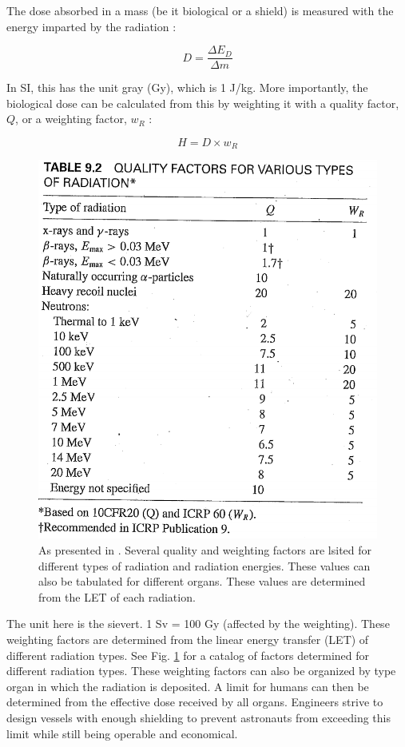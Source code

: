 The dose absorbed in a mass (be it biological or a shield) is measured with the energy imparted by the radiation \cite{lamarsh}:

\begin{equation}
D = \frac{\Delta E_{D}}{\Delta m}
\end{equation}

In SI, this has the unit gray (Gy), which is 1 J/kg. More importantly, the biological dose can be calculated from this by weighting it with a quality factor, $Q$, or a weighting factor, $w_{R}$ \cite{lamarsh}:

\begin{equation}
H = D \times w_{R}
\end{equation}

\begin{figure}
\centering
\includegraphics[scale=0.5]{wr.png}
\caption{As presented in \cite{lamarsh}. Several quality and weighting factors are lsited for different types of radiation and radiation energies. These values can also be tabulated for different organs. These values are determined from the LET of each radiation.}
\label{fig:wr}
\end{figure}

The unit here is the sievert. 1 Sv = 100 Gy (affected by the weighting). These weighting factors are determined from the linear energy transfer (LET) of different radiation types. See Fig. \ref{fig:wr} for a catalog of factors determined for different radiation types. These weighting factors can also be organized by type organ in which the radiation is deposited. A limit for humans can then be determined from the effective dose received by all organs. Engineers strive to design vessels with enough shielding to prevent astronauts from exceeding this limit while still being operable and economical.
